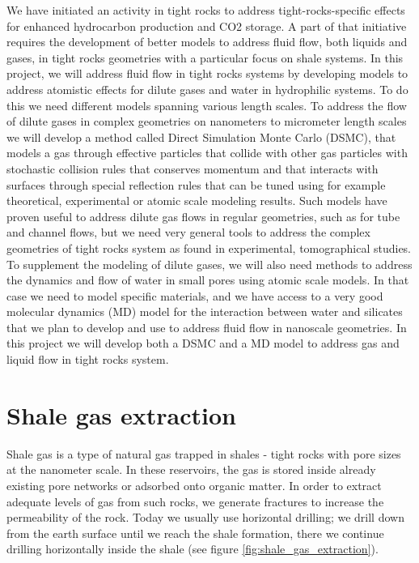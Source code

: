 We have initiated an activity in tight rocks to address tight-rocks-specific effects for enhanced hydrocarbon production and CO2 storage. A part of that initiative requires the development of better models to address fluid flow, both liquids and gases, in tight rocks geometries with a particular focus on shale systems. In this project, we will address fluid flow in tight rocks systems by developing models to address atomistic effects for dilute gases and water in hydrophilic systems. To do this we need different models spanning various length scales. To address the flow of dilute gases in complex geometries on nanometers to micrometer length scales we will develop a method called Direct Simulation Monte Carlo (DSMC), that models a gas through effective particles that collide with other gas particles with stochastic collision rules that conserves momentum and that interacts with surfaces through special reflection rules that can be tuned using for example theoretical, experimental or atomic scale modeling results. Such models have proven useful to address dilute gas flows in regular geometries, such as for tube and channel flows, but we need very general tools to address the complex geometries of tight rocks system as found in experimental, tomographical studies. To supplement the modeling of dilute gases, we will also need methods to address the dynamics and flow of water in small pores using atomic scale models. In that case we need to model specific materials, and we have access to a very good molecular dynamics (MD) model for the interaction between water and silicates that we plan to develop and use to address fluid flow in nanoscale geometries. In this project we will develop both a DSMC and a MD model to address gas and liquid flow in tight rocks system.
\section{Shale gas extraction}
Shale gas is a type of natural gas trapped in shales - tight rocks with pore sizes at the nanometer scale. In these reservoirs, the gas is stored inside already existing pore networks or adsorbed onto organic matter. In order to extract adequate levels of gas from such rocks, we generate fractures to increase the permeability of the rock. Today we usually use horizontal drilling; we drill down from the earth surface until we reach the shale formation, there we continue drilling horizontally inside the shale (see figure \ref{fig:shale_gas_extraction}).

